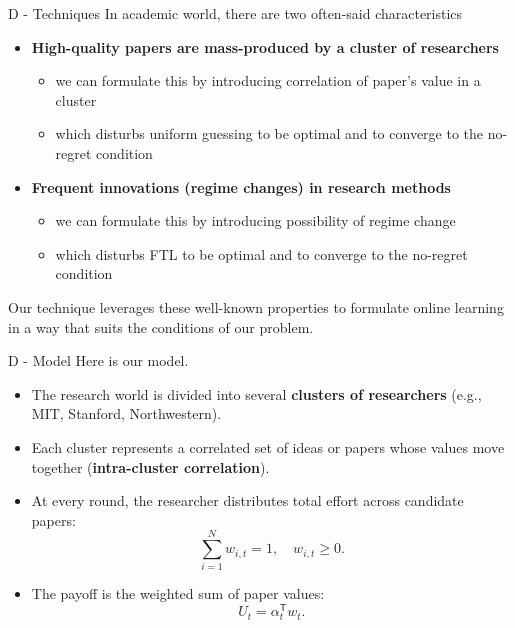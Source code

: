 \documentclass{beamer}
\begin{document}
\begin{frame}{D - Techniques}
    In academic world, there are two often-said characteristics
    \begin{itemize}
        \item \textbf{High-quality papers are mass-produced by a cluster of researchers}
        \begin{itemize}
            \item we can formulate this by introducing correlation of paper's value in a cluster
            \item which disturbs uniform guessing to be optimal and to converge to the no-regret condition
        \end{itemize}
        \item \textbf{Frequent innovations (regime changes) in research methods}
        \begin{itemize}
            \item we can formulate this by introducing possibility of regime change 
            \item which disturbs FTL to be optimal and to converge to the no-regret condition
        \end{itemize}
    \end{itemize}
    Our technique leverages these well-known properties to formulate online learning in a way that suits the conditions of our problem.
\end{frame}

\begin{frame}{D - Model}
Here is our model.
\begin{itemize}
    \item The research world is divided into several \textbf{clusters of researchers} 
          (e.g., MIT, Stanford, Northwestern).
    \item Each cluster represents a correlated set of ideas or papers whose values
          move together (\textbf{intra-cluster correlation}).
    \item At every round, the researcher distributes total effort 
          across candidate papers:
          \[
          \sum_{i=1}^{N} w_{i,t} = 1, \quad w_{i,t} \ge 0.
          \]
    \item The payoff is the weighted sum of paper values:
          \[
          U_t = \alpha_t^{\mathsf{T}} w_t.
          \]
\end{itemize}
\end{frame}
\end{document}
